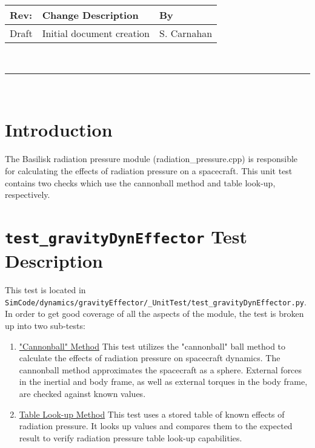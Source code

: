 \documentclass[]{BasiliskReportMemo}
\begin{document}
\makeCover


%
%
\pagestyle{empty}
{\renewcommand{\arraystretch}{1.1}
\noindent
\begin{longtable}{|p{0.5in}|p{4.5in}|p{1.14in}|}
\hline
{\bfseries Rev}: & {\bfseries Change Description} & {\bfseries By} \\
\hline
Draft & Initial document creation & S. Carnahan \\
\hline

\end{longtable}
}

\newpage
\setcounter{page}{1}
\pagestyle{fancy}

\tableofcontents
~\\ \hrule ~\\


\section{Introduction}
The Basilisk radiation pressure module (radiation\_pressure.cpp) is responsible for calculating the effects of radiation pressure on a spacecraft. This unit test contains two checks which use the cannonball method and table look-up, respectively.

\section{{\tt test\_gravityDynEffector} Test Description}

This test is located in {\tt SimCode/dynamics/gravityEffector/\_UnitTest/test\_gravityDynEffector.py}. In order to get good coverage of all the aspects of the module, the test is broken up into two sub-tests: \par

\begin{enumerate}
	\item \underline{"Cannonball" Method} This test utilizes the "cannonball" ball method to calculate the effects of radiation pressure on spacecraft dynamics. The cannonball method approximates the spacecraft as a sphere. External forces in the inertial and body frame, as well as external torques in the body frame, are checked against known values.
	\item \underline{Table Look-up Method} This test uses a stored table of known effects of radiation pressure. It looks up values and compares them to the expected result to verify radiation pressure table look-up capabilities.
\end{enumerate} 
\end{document}
